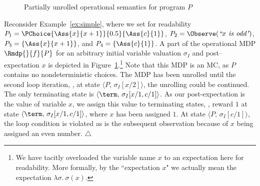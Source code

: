 \begin{figure}[t]
\begin{center}
{
 }	
\end{center}
\caption{Partially unrolled operational semantics for program $P$}	
\label{fig:better_operational_example}
\end{figure}
\begin{example}


Reconsider Example~\ref{ex:simple}, where we set for readability $P_1= \PChoice{\Ass{x}{x + 1}}{0.5}{\Ass{c}{1}}$, $P_2= \Observe (\textit{``$x$ is odd"})$, $P_3= \{\Ass{x}{x+1}\}$, and $P_4=\{\Ass{c}{1}\}$. 
A part of the operational MDP $\Rmdp{}{f}{P}$ for an arbitrary initial variable valuation $\sigma_I$ and post--expectation $x$ is depicted in Figure~\ref{fig:better_operational_example}.\footnote{We have tacitly overloaded the variable name $x$ to an expectation here for readability. More formally, by the ``expectation $x$" we actually mean the expectation $\lambda \sigma.~ \sigma(x)$.}
Note that this MDP is an MC, as $P$ contains no nondeterministic choices. The MDP has been unrolled until the second loop iteration, \ie, at state $\langle P,\,\sigma_I[x/2]\rangle$, the unrolling could be continued. The only terminating state is $\langle \term,\,\sigma_I[x/1,c/1]\rangle$. 
As our post-expectation is the value of variable $x$, we assign this value to terminating states, \ie, reward $\boxed{1}$ at state $\langle \term,\,\sigma_I[x/1,c/1]\rangle$, where $x$ has been assigned $1$. At state $\langle P,\,\sigma_I[c/1]\rangle$, the loop condition is violated as is the subsequent observation because of $x$ being assigned an even number.
\hfill$\triangle$
\end{example}

